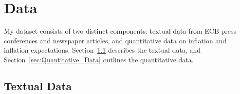\documentclass[review]{elsarticle}
\begin{document}
\section{Data} \label{sec:Data}

My dataset consists of two distinct components: textual data from ECB press conferences and newspaper articles, and quantitative data on inflation and inflation expectations. Section~\ref{sec:Textual_Data} describes the textual data, and Section~\ref{sec:Quantitative_Data} outlines the quantitative data.

\subsection{Textual Data} \label{sec:Textual_Data}
\end{document}
